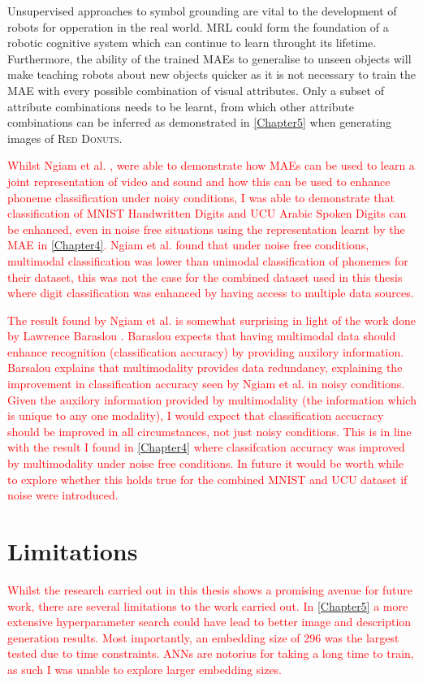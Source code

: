 Unsupervised approaches to symbol grounding are vital to the development of robots for opperation in the real world. \ac{MRL} could form the foundation of a robotic cognitive system which can continue to learn throught its lifetime. Furthermore, the ability of the trained \acp{MAE} to generalise to unseen objects will make teaching robots about new objects quicker as it is not necessary to train the \ac{MAE} with every possible combination of visual attributes. Only a subset of attribute combinations needs to be learnt, from which other attribute combinations can be inferred as demonstrated in \autoref{Chapter5} when generating images of \textsc{Red Donuts}.

\textcolor{red}{Whilst Ngiam et al. \cite{ngiam2011multimodal}, were able to demonstrate how \acp{MAE} can be used to learn a joint representation of video and sound and how this can be used to enhance phoneme classification under noisy conditions, I was able to demonstrate that classification of MNIST Handwritten Digits and UCU Arabic Spoken Digits can be enhanced, even in noise free situations using the representation learnt by the \ac{MAE} in \autoref{Chapter4}. Ngiam et al. found that under noise free conditions, multimodal classification was lower than unimodal classification of phonemes for their dataset, this was not the case for the combined dataset used in this thesis where digit classification was enhanced by having access to multiple data sources.}

\textcolor{red}{The result found by Ngiam et al. \cite{ngiam2011multimodal} is somewhat surprising in light of the work done by Lawrence Baraslou \cite{barsalou2008grounded}. Baraslou expects that having multimodal data should enhance recognition (classification accuracy) by providing auxilory information. Barsalou explains that multimodality provides data redundancy, explaining the improvement in classification accuracy seen by Ngiam et al. in noisy conditions. Given the auxilory information provided by multimodality (the information which is unique to any one modality), I would expect that classification accucracy should be improved in all circumstances, not just noisy conditions. This is in line with the result I found in \autoref{Chapter4} where classifcation accuracy was improved by multimodality under noise free conditions. In future it would be worth while to explore whether this holds true for the combined MNIST and UCU dataset if noise were introduced.}

\section{Limitations}
\textcolor{red}{Whilst the research carried out in this thesis shows a promising avenue for future work, there are several limitations to the work carried out. In \autoref{Chapter5} a more extensive hyperparameter search could have lead to better image and description generation results. Most importantly, an embedding size of 296 was the largest tested due to time constraints. \aclp{ANN} are notorius for taking a long time to train, as such I was unable to explore larger embedding sizes.}

